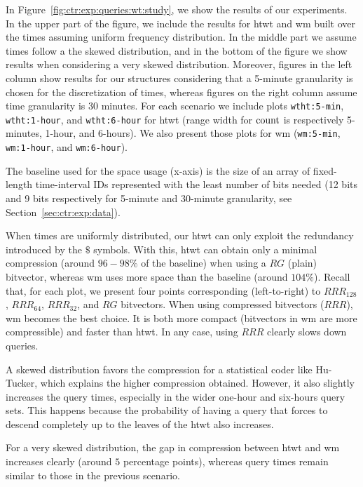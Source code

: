 	In Figure~\ref{fig:ctr:exp:queries:wt:study}, we show the results of our experiments. In the upper part of the figure, we 
	include the results for \gls{htwt} and \gls{wm} built over the times assuming uniform frequency distribution.
	In the middle part we assume times follow a the skewed distribution, and in the bottom of the figure we show
	results when considering a very skewed distribution. Moreover, figures in the left column show results
	for our structures considering that a 5-minute granularity is chosen for the discretization of times, whereas
	figures on the right column assume time granularity is 30 minutes. For each scenario we include plots
	\texttt{wtht:5-min}, \texttt{wtht:1-hour}, and \texttt{wtht:6-hour} for \gls{htwt} (range width for $\operatorname{count}$ is respectively
	5-minutes, 1-hour, and 6-hours). We also present those plots for \gls{wm} (\texttt{wm:5-min}, \texttt{wm:1-hour}, and \texttt{wm:6-hour}).

	The baseline used for the space usage (x-axis) is the size of an array of
	fixed-length time-interval IDs represented with the least number of bits needed (12 bits and 9 bits
	respectively for 5-minute and 30-minute granularity, see Section~\ref{sec:ctr:exp:data}).
	\medskip

	When times are uniformly distributed, our \gls{htwt} can only exploit the redundancy introduced by
	the $\$$ symbols. With this, \gls{htwt} can obtain only a minimal compression (around $96-98\%$ of the baseline)
	when using a $RG$ (plain) bitvector, whereas \gls{wm} uses more space than the baseline (around $104\%$).
	Recall that, for each plot, we present four points corresponding (left-to-right) 
	to $RRR_{128}$, $RRR_{64}$, $RRR_{32}$, and $RG$ bitvectors.
	When using compressed  bitvectors ($RRR$), \gls{wm} becomes the best choice. It is both more compact 
	(bitvectors in \gls{wm} are more compressible) and faster than \gls{htwt}. 
	In any case, using $RRR$ clearly slows down queries.

	A skewed distribution favors the compression for a statistical coder like Hu-Tucker,
	which explains the higher compression obtained. However,
	it also slightly increases the query times, especially in the wider
	one-hour and six-hours query sets. This happens because the probability of having a query 
	that forces to descend completely up to the leaves of the \gls{htwt} also increases.

	For a very skewed distribution, the gap in compression between \gls{htwt} and \gls{wm} increases clearly (around 
	$5$ percentage points), whereas query times remain similar to those in the previous scenario.

